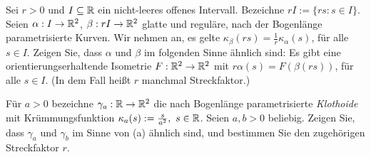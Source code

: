 \begin{Problem}
	\begin{parts}
	\item Sei $r > 0$ und $I \subseteq \mathbb{R}$ ein nicht-leeres offenes Intervall. Bezeichne $rI := \{rs : s \in I\}$. Seien $\alpha : I \to \mathbb{R}^2$, $\beta : rI \to \mathbb{R}^2$ glatte und reguläre, nach der Bogenlänge parametrisierte Kurven. Wir nehmen an, es gelte $\kappa_\beta(rs) = \frac{1}{r}\kappa_\alpha(s)$, für alle $s \in I$. Zeigen Sie, dass $\alpha$ und $\beta$ im folgenden Sinne ähnlich sind: Es gibt eine orientierungserhaltende Isometrie $F : \mathbb{R}^2 \to \mathbb{R}^2$ mit $r\alpha(s) = F(\beta(rs))$, für alle $s \in I$. (In dem Fall heißt $r$ manchmal Streckfaktor.)
	\item Für $a > 0$ bezeichne $\gamma_a : \mathbb{R} \to \mathbb{R}^2$ die nach Bogenlänge parametrisierte \emph{Klothoide} mit Krümmungsfunktion $\kappa_a(s) := \frac{s}{a^2},~s \in \mathbb{R}$. Seien $a, b > 0$ beliebig. Zeigen Sie, dass $\gamma_a$ und $\gamma_b$ im Sinne von (a) ähnlich sind, und bestimmen Sie den zugehörigen Streckfaktor $r$. 
\end{parts}
\end{Problem}
